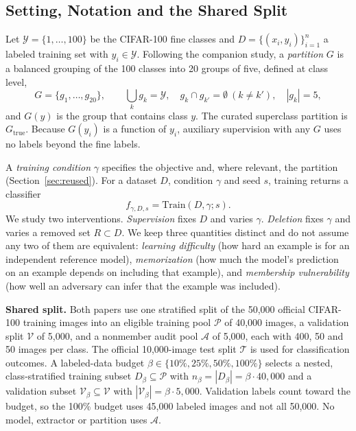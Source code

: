 \documentclass{article} %
\newcommand{\Gtrue}{G_{\mathrm{true}}}
\newcommand{\pool}{\mathcal{P}}
\newcommand{\audit}{\mathcal{A}}
\newcommand{\valset}{\mathcal{V}}
\newcommand{\testset}{\mathcal{T}}
\begin{document}
\subsection{Setting, Notation and the Shared Split}
\label{sec:setting}

Let $\mathcal{Y}=\{1,\ldots,100\}$ be the CIFAR-100 fine classes and $D=\{(x_i,y_i)\}_{i=1}^{n}$ a labeled training set with $y_i\in\mathcal{Y}$. Following the companion study, a \emph{partition} $G$ is a balanced grouping of the 100 classes into 20 groups of five, defined at class level,
\begin{equation}
G=\{g_1,\ldots,g_{20}\},\qquad \textstyle\bigcup_k g_k=\mathcal{Y},\quad g_k\cap g_{k'}=\emptyset\ (k\neq k'),\quad |g_k|=5,
\label{eq:partition}
\end{equation}
and $G(y)$ is the group that contains class $y$. The curated superclass partition is $\Gtrue$. Because $G(y_i)$ is a function of $y_i$, auxiliary supervision with any $G$ uses no labels beyond the fine labels.

A \emph{training condition} $\gamma$ specifies the objective and, where relevant, the partition (Section~\ref{sec:reused}). For a dataset $D$, condition $\gamma$ and seed $s$, training returns a classifier
\begin{equation}
f_{\gamma,D,s}=\mathrm{Train}(D,\gamma;s).
\label{eq:train}
\end{equation}
We study two interventions. \emph{Supervision} fixes $D$ and varies $\gamma$. \emph{Deletion} fixes $\gamma$ and varies a removed set $R\subset D$. We keep three quantities distinct and do not assume any two of them are equivalent: \emph{learning difficulty} (how hard an example is for an independent reference model), \emph{memorization} (how much the model's prediction on an example depends on including that example), and \emph{membership vulnerability} (how well an adversary can infer that the example was included).

\textbf{Shared split.} Both papers use one stratified split of the 50,000 official CIFAR-100 training images into an eligible training pool $\pool$ of 40,000 images, a validation split $\valset$ of 5,000, and a nonmember audit pool $\audit$ of 5,000, each with 400, 50 and 50 images per class. The official 10,000-image test split $\testset$ is used for classification outcomes. A labeled-data budget $\beta\in\{10\%,25\%,50\%,100\%\}$ selects a nested, class-stratified training subset $D_\beta\subseteq\pool$ with $n_\beta=|D_\beta|=\beta\cdot 40{,}000$ and a validation subset $\valset_\beta\subseteq\valset$ with $|\valset_\beta|=\beta\cdot 5{,}000$. Validation labels count toward the budget, so the 100\% budget uses 45,000 labeled images and not all 50,000. No model, extractor or partition uses $\audit$.
\end{document}
